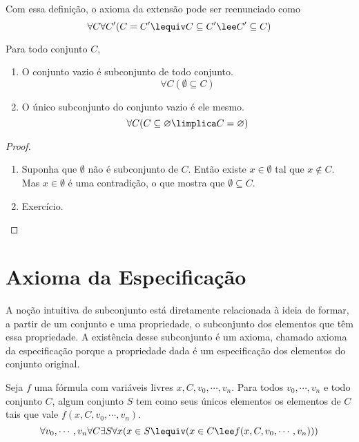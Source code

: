 Com essa definição, o axioma da extensão pode ser reenunciado como
	\begin{equation*}
	\forall C \forall C' (C = C' \lequiv C \subseteq C' \lee C' \subseteq C)
	\end{equation*}

\begin{prop}
Para todo conjunto $C$,
	\begin{enumerate}
	\item O conjunto vazio é subconjunto de todo conjunto.
		\begin{equation*}
		\forall C(\emptyset \subseteq C)
		\end{equation*}
	\item O único subconjunto do conjunto vazio é ele mesmo.
		\begin{equation*}
		\forall C(C \subseteq \emptyset \limplica C = \emptyset)
		\end{equation*}
	\end{enumerate}
\end{prop}
\begin{proof}
	\begin{enumerate}
	\item Suponha que $\emptyset$ não é subconjunto de $C$. Então existe $x \in \emptyset$ tal que $x \notin C$. Mas $x \in \emptyset$ é uma contradição, o que mostra que $\emptyset \subseteq C$.
	
	\item Exercício.
	\end{enumerate}
\end{proof}

\section{Axioma da Especificação}

A noção intuitiva de subconjunto está diretamente relacionada à ideia de formar, a partir de um conjunto e uma propriedade, o subconjunto dos elementos que têm essa propriedade. A existência desse subconjunto é um axioma, chamado axioma da especificação porque a propriedade dada é um especificação dos elementos do conjunto original.

\begin{axi}
Seja $f$ uma fórmula com variáveis livres $x,C,v_0,\cdots,v_n$. Para todos $v_0,\cdots,v_n$ e todo conjunto $C$, algum conjunto $S$ tem como seus únicos elementos os elementos de $C$ tais que vale $f(x,C,v_0,\cdots,v_n)$.
	\begin{equation*}
	\forall v_0,\cdots,v_n \forall C \exists S \forall x(x \in S \lequiv (x \in C \lee f(x,C,v_0,\cdots,v_n)))
	\end{equation*}
\end{axi}

